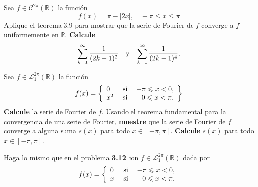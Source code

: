 \documentclass[12pt]{report}
\theoremstyle{largebreak}
\renewcommand{\leq}{\ensuremath{\leqslant}}
\newcommand\abs[1]{\ensuremath{\left|#1\right|}}
\begin{document}
    \begin{excer}
        Sea $f\in\mathcal{C}^{2\pi}(\mathbb{R})$ la función
        \begin{equation*}
            f(x)=\pi-\abs{2x},\quad-\pi\leq x\leq\pi
        \end{equation*}
        Aplique el teorema 3.9 para mostrar que la serie de Fourier de $f$ converge a $f$ uniformemente en $\mathbb{R}$. \textbf{Calcule}
        \begin{equation*}
            \sum_{ k=1}^\infty\frac{1}{(2k-1)^2}\quad\textup{y}\quad\sum_{ k=1}^\infty\frac{1}{(2k-1)^4}.
        \end{equation*}
    \end{excer}

    \begin{sol}
        
    \end{sol}

    \begin{excer}
        Sea $f\in\mathcal{L}_1^{2\pi}(\mathbb{R})$ la función
        \begin{equation*}
            f(x)=\left\{ 
                \begin{array}{lcr}
                    0 & \textup{ si } & -\pi\leq x<0,\\
                    x^2 & \textup{ si } & 0\leq x<\pi.\\
                \end{array}
            \right\}
        \end{equation*}
        \textbf{Calcule} la serie de Fourier de $f$. Usando el teorema fundamental para la convergencia de una serie de Fourier, \textbf{muestre} que la serie de Fourier de $f$ converge a alguna suma $s(x)$ para todo $x\in[-\pi,\pi]$. \textbf{Calcule} $s(x)$ para todo $x\in[-\pi,\pi]$.
    \end{excer}

    \begin{sol}
        
    \end{sol}

    \begin{excer}
        Haga lo mismo que en el problema \textbf{3.12} con $f\in\mathcal{L}_1^{2\pi}(\mathbb{R})$ dada por
        \begin{equation*}
            f(x)=\left\{ 
                \begin{array}{lcr}
                    0 & \textup{ si } & -\pi\leq x<0,\\
                    x & \textup{ si } & 0\leq x<\pi.\\
                \end{array}
            \right.
        \end{equation*}
    \end{excer}

    \begin{sol}
        
    \end{sol}
\end{document}
